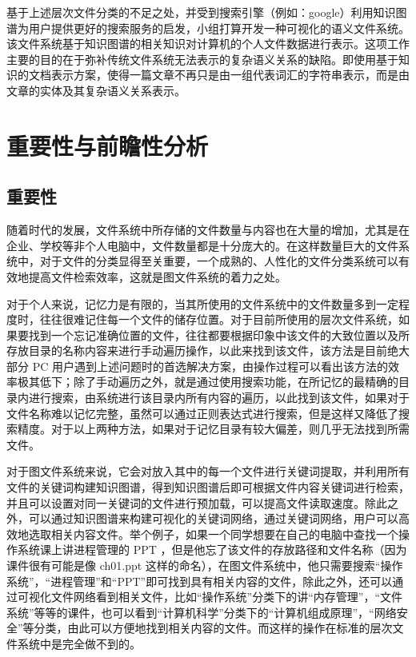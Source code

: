 \documentclass[UTF8]{ctexart}
\begin{document}
基于上述层次文件分类的不足之处，并受到搜索引擎（例如：google）利用知识图谱为用户提供更好的搜索服务的启发，小组打算开发一种可视化的语义文件系统。该文件系统基于知识图谱的相关知识对计算机的个人文件数据进行表示。这项工作主要的目的在于弥补传统文件系统无法表示的复杂语义关系的缺陷。即使用基于知识的文档表示方案，使得一篇文章不再只是由一组代表词汇的字符串表示，而是由文章的实体及其复杂语义关系表示。

\section{重要性与前瞻性分析}
\subsection{重要性}
随着时代的发展，文件系统中所存储的文件数量与内容也在大量的增加，尤其是在企业、学校等非个人电脑中，文件数量都是十分庞大的。在这样数量巨大的文件系统中，对于文件的分类显得至关重要，一个成熟的、人性化的文件分类系统可以有效地提高文件检索效率，这就是图文件系统的着力之处。

对于个人来说，记忆力是有限的，当其所使用的文件系统中的文件数量多到一定程度时，往往很难记住每一个文件的储存位置。对于目前所使用的层次文件系统，如果要找到一个忘记准确位置的文件，往往都要根据印象中该文件的大致位置以及所存放目录的名称内容来进行手动遍历操作，以此来找到该文件，该方法是目前绝大部分 PC 用户遇到上述问题时的首选解决方案，由操作过程可以看出该方法的效率极其低下；除了手动遍历之外，就是通过使用搜索功能，在所记忆的最精确的目录内进行搜索，由系统进行该目录内所有内容的遍历，以此找到该文件，如果对于文件名称难以记忆完整，虽然可以通过正则表达式进行搜索，但是这样又降低了搜索精度。对于以上两种方法，如果对于记忆目录有较大偏差，则几乎无法找到所需文件。

对于图文件系统来说，它会对放入其中的每一个文件进行关键词提取，并利用所有文件的关键词构建知识图谱，得到知识图谱后即可根据文件内容关键词进行检索，并且可以设置对同一关键词的文件进行预加载，可以提高文件读取速度。除此之外，可以通过知识图谱来构建可视化的关键词网络，通过关键词网络，用户可以高效地选取相关内容文件。举个例子，如果一个同学想要在自己的电脑中查找一个操作系统课上讲进程管理的 PPT ，但是他忘了该文件的存放路径和文件名称（因为课件很有可能是像 ch01.ppt 这样的命名），在图文件系统中，他只需要搜索“操作系统”，“进程管理”和“PPT”即可找到具有相关内容的文件，除此之外，还可以通过可视化文件网络看到相关文件，比如“操作系统”分类下的讲“内存管理”，“文件系统”等等的课件，也可以看到“计算机科学”分类下的“计算机组成原理”，“网络安全”等分类，由此可以方便地找到相关内容的文件。而这样的操作在标准的层次文件系统中是完全做不到的。
\end{document}
